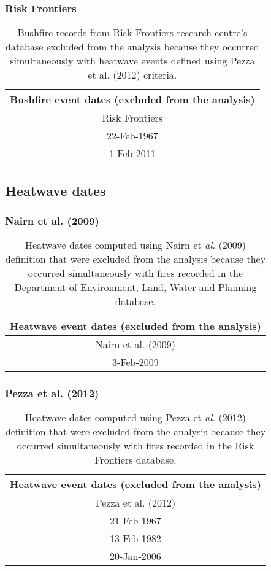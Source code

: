 \subsubsection{Risk Frontiers }

\begin{table}[H]
\caption{Bushfire records from Risk Frontiers research centre's database excluded
from the analysis because they occurred simultaneously with heatwave
events defined using Pezza et al. (2012) criteria. }


\centering{}%
\begin{tabular}{|c|}
\hline 
\textbf{Bushfire event dates (excluded from the analysis)}\tabularnewline
\hline 
\hline 
Risk Frontiers\tabularnewline
\hline 
22-Feb-1967\tabularnewline
\hline 
1-Feb-2011\tabularnewline
\hline 
\end{tabular}
\end{table}



\subsection{Heatwave dates}


\subsubsection{Nairn et al. (2009) }

\begin{table}[H]
\caption{Heatwave dates computed using Nairn et \textit{al.} (2009) definition
that were excluded from the analysis because they occurred simultaneously
with fires recorded in the Department of Environment, Land, Water
and Planning database. }


\centering{}%
\begin{tabular}{|c|}
\hline 
\textbf{Heatwave event dates (excluded from the analysis)}\tabularnewline
\hline 
\hline 
Nairn et al. (2009)\tabularnewline
\hline 
3-Feb-2009\tabularnewline
\hline 
\end{tabular}
\end{table}



\subsubsection{Pezza et al. (2012) }

\begin{table}[H]
\caption{Heatwave dates computed using Pezza et \textit{al.} (2012) definition
that were excluded from the analysis because they occurred simultaneously
with fires recorded in the Risk Frontiers database. }


\centering{}%
\begin{tabular}{|c|}
\hline 
\textbf{Heatwave event dates (excluded from the analysis)}\tabularnewline
\hline 
\hline 
Pezza et al. (2012)\tabularnewline
\hline 
21-Feb-1967\tabularnewline
\hline 
13-Feb-1982\tabularnewline
\hline 
20-Jan-2006\tabularnewline
\hline 
\end{tabular}
\end{table}



